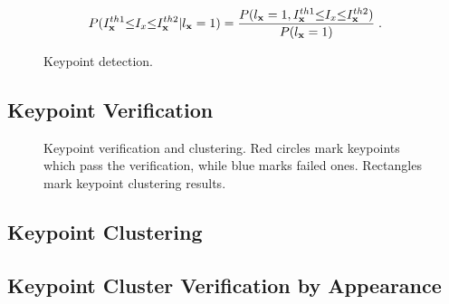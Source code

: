 \documentclass{JoITSRstyle}
\begin{document}
\begin{equation}
P(I^{th1}_{\bf{x}}{\leq}I_x{\leq}{I^{th2}_{\bf{x}}}|l_{\bf{x}}=1)=
\frac
{P(l_{\bf{x}}=1,I^{th1}_{\bf{x}}{\leq}I_x{\leq}{I^{th2}_{\bf{x}}})} {P(l_{\bf{x}}=1)}\;.
\label{eq1.1}
\end{equation}


\begin{figure}
\centering
{}
\caption{Keypoint detection. }
\label{fig:sec}
\end{figure}
\subsection{Keypoint Verification}


\begin{figure}
\centering
{}
\caption{Keypoint verification and clustering. Red circles mark keypoints which pass the verification, while blue marks failed ones. Rectangles mark keypoint clustering results. }
\label{fig:thir}
\end{figure}
\subsection{Keypoint Clustering}



\subsection{Keypoint Cluster Verification by Appearance}
\end{document}
